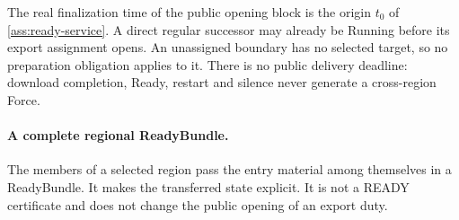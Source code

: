 \documentclass[11pt,a4paper]{article}
\begin{document}
The real finalization time of the public opening block is the origin
$t_0$ of \cref{ass:ready-service}. A direct regular successor may already
be Running before its export assignment opens. An unassigned boundary has
no selected target, so no preparation obligation applies to it. There is
no public delivery deadline: download completion, Ready, restart and
silence never generate a cross-region Force.


\paragraph{A complete regional ReadyBundle.}
\label{sec:ready-bundle}
The members of a selected region pass the entry material among themselves
in a ReadyBundle. It makes the transferred state explicit. It is not a
READY certificate and does not change the public opening of an export
duty.
\end{document}
